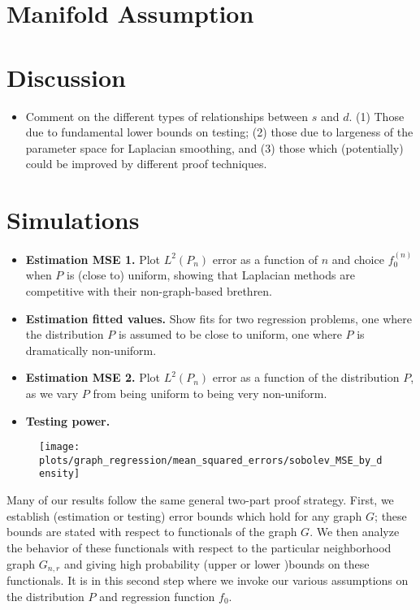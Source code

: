 \documentclass{article}
\newcommand{\1}{\mathbf{1}}
\theoremstyle{alden}
\theoremstyle{aldenthm}
\theoremstyle{definition}
\theoremstyle{remark}
\begin{document}
\section{Manifold Assumption}
\label{sec:manifold_assumption}


\section{Discussion}

\begin{itemize}
	\item Comment on the different types of relationships between $s$ and $d$. (1) Those due to fundamental lower bounds on testing; (2) those due to largeness of the parameter space for Laplacian smoothing, and (3) those which (potentially) could be improved by different proof techniques.
\end{itemize}

\section{Simulations}
\begin{itemize}
	\item \textbf{Estimation MSE 1.} Plot $L^2(P_n)$ error as a function of $n$ and choice $f_0^{(n)}$ when $P$ is (close to) uniform, showing that Laplacian methods are competitive with their non-graph-based brethren.
	\item \textbf{Estimation fitted values.} Show fits for two regression problems, one where the distribution $P$ is assumed to be close to uniform, one where $P$ is dramatically non-uniform.
	\item \textbf{Estimation MSE 2.} Plot $L^2(P_n)$ error as a function of the distribution $P$, as we vary $P$ from being uniform to being very non-uniform.
	 
	\item \textbf{Testing power.} 
\end{itemize}

\begin{figure}
	\centering
	\texttt{[image: plots/graph\_regression/mean\_squared\_errors/sobolev\_MSE\_by\_density]}
	\caption{}
	\label{fig:piecewise_cosine}
\end{figure}

\clearpage

\appendix

Many of our results follow the same general two-part proof strategy. First, we establish (estimation or testing) error bounds which hold for any graph $G$; these bounds are stated with respect to functionals of the graph $G$. We then analyze the behavior of these functionals with respect to the particular neighborhood graph $G_{n,r}$ and giving high probability (upper or lower )bounds on these functionals. It is in this second step where we invoke our various assumptions on the distribution $P$ and regression function $f_0$.
\end{document}
